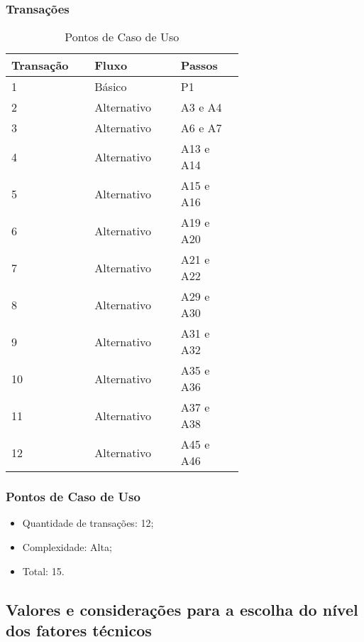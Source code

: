 \subsubsection{Transações}

\begin{table*}[!h]
\centering
\caption{Pontos de Caso de Uso}
\label{Rotulo}
  \begin{tabular}{|p{0.20\linewidth}|p{0.25\linewidth}|p{0.20\linewidth}|}
  \hline
  \textbf{Transação} & \textbf{Fluxo} & \textbf{Passos} \\ 
  \hline
  1 & Básico & P1\\
  \hline
  2 & Alternativo & A3 e A4\\
  \hline
  3 & Alternativo & A6 e A7\\
  \hline
  4 & Alternativo & A13 e A14\\
  \hline
  5 & Alternativo & A15 e A16\\
  \hline
  6 & Alternativo & A19 e A20\\
   \hline
  7 & Alternativo & A21 e A22\\
   \hline
  8 & Alternativo & A29 e A30\\
     \hline
  9 & Alternativo & A31 e A32\\
     \hline
  10 & Alternativo & A35 e A36\\
     \hline
  11 & Alternativo & A37 e A38\\
     \hline
  12 & Alternativo & A45 e A46\\
  \hline
  \end{tabular}
\end{table*}

\pagebreak
\subsubsection{Pontos de Caso de Uso}

\begin{itemize}
 \item Quantidade de transações: 12;
 \item Complexidade: Alta;
 \item Total: 15.
\end{itemize}

\vfill

\subsection{Valores e considerações para a escolha do nível dos fatores técnicos}

